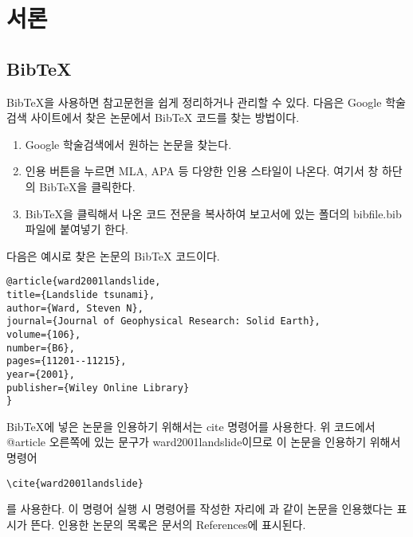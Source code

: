 \section{서론}

\subsection{BibTeX}

BibTeX을 사용하면 참고문헌을 쉽게 정리하거나 관리할 수 있다. 다음은 Google 학술검색 사이트에서 찾은 논문에서 BibTeX 코드를 찾는 방법이다.

\begin{enumerate}
	\item Google 학술검색에서 원하는 논문을 찾는다.
	\item 인용 버튼을 누르면 MLA, APA 등 다양한 인용 스타일이 나온다. 여기서 창 하단의 BibTeX을 클릭한다.
	\item BibTeX을 클릭해서 나온 코드 전문을 복사하여 보고서에 있는 폴더의 bibfile.bib 파일에 붙여넣기 한다.
\end{enumerate}

다음은 예시로 찾은 논문의 BibTeX 코드이다.
\begin{lstlisting}
@article{ward2001landslide,
title={Landslide tsunami},
author={Ward, Steven N},
journal={Journal of Geophysical Research: Solid Earth},
volume={106},
number={B6},
pages={11201--11215},
year={2001},
publisher={Wiley Online Library}
}
\end{lstlisting}

BibTeX에 넣은 논문을 인용하기 위해서는 cite 명령어를 사용한다. 위 코드에서 @article 오른쪽에 있는 문구가 ward2001landslide이므로 이 논문을 인용하기 위해서 명령어
\begin{lstlisting}
\cite{ward2001landslide}
\end{lstlisting}
를 사용한다. 이 명령어 실행 시 명령어를 작성한 자리에 \cite{ward2001landslide}과 같이 논문을 인용했다는 표시가 뜬다. 인용한 논문의 목록은 문서의 References에 표시된다.
